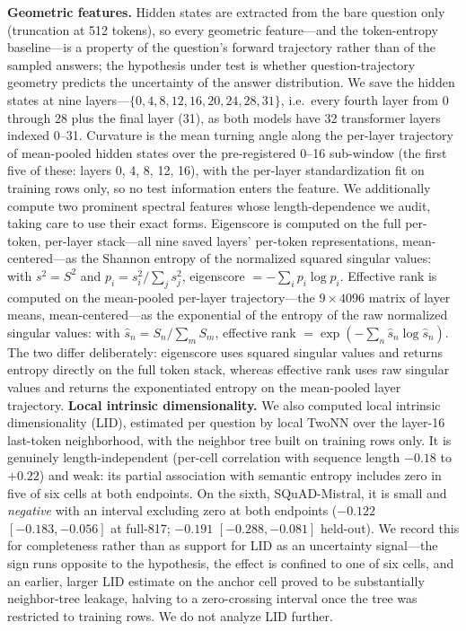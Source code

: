 \documentclass[11pt]{article}
\begin{document}
\textbf{Geometric features.} Hidden states are extracted from the bare question only (truncation at 512 tokens), so every geometric feature---and the token-entropy baseline---is a property of the question's forward trajectory rather than of the sampled answers; the hypothesis under test is whether question-trajectory geometry predicts the uncertainty of the answer distribution. We save the hidden states at nine layers---$\{0, 4, 8, 12, 16, 20, 24, 28, 31\}$, i.e.\ every fourth layer from 0 through 28 plus the final layer (31), as both models have 32 transformer layers indexed 0--31. Curvature is the mean turning angle along the per-layer trajectory of mean-pooled hidden states over the pre-registered 0--16 sub-window (the first five of these: layers 0, 4, 8, 12, 16), with the per-layer standardization fit on training rows only, so no test information enters the feature. We additionally compute two prominent spectral features whose length-dependence we audit, taking care to use their exact forms. Eigenscore is computed on the full per-token, per-layer stack---all nine saved layers' per-token representations, mean-centered---as the Shannon entropy of the normalized squared singular values: with $s^2 = S^2$ and $p_i = s_i^2 / \sum_j s_j^2$, eigenscore $= -\sum_i p_i \log p_i$. Effective rank is computed on the mean-pooled per-layer trajectory---the $9 \times 4096$ matrix of layer means, mean-centered---as the exponential of the entropy of the raw normalized singular values: with $\hat{s}_n = S_n / \sum_m S_m$, effective rank $= \exp(-\sum_n \hat{s}_n \log \hat{s}_n)$. The two differ deliberately: eigenscore uses squared singular values and returns entropy directly on the full token stack, whereas effective rank uses raw singular values and returns the exponentiated entropy on the mean-pooled layer trajectory.
\textbf{Local intrinsic dimensionality.} We also computed local intrinsic dimensionality (LID), estimated per question by local TwoNN over the layer-16 last-token neighborhood, with the neighbor tree built on training rows only. It is genuinely length-independent (per-cell correlation with sequence length $-0.18$ to $+0.22$) and weak: its partial association with semantic entropy includes zero in five of six cells at both endpoints. On the sixth, SQuAD-Mistral, it is small and \emph{negative} with an interval excluding zero at both endpoints ($-0.122$ $[-0.183, -0.056]$ at full-817; $-0.191$ $[-0.288, -0.081]$ held-out). We record this for completeness rather than as support for LID as an uncertainty signal---the sign runs opposite to the hypothesis, the effect is confined to one of six cells, and an earlier, larger LID estimate on the anchor cell proved to be substantially neighbor-tree leakage, halving to a zero-crossing interval once the tree was restricted to training rows. We do not analyze LID further.
\end{document}
